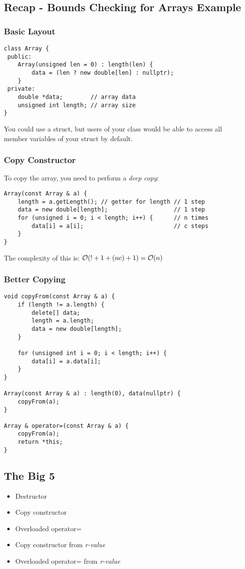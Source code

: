 \subsection{Recap - Bounds Checking for Arrays Example}
\subsubsection{Basic Layout}
\begin{lstlisting}[style=C++]
class Array {
 public:
    Array(unsigned len = 0) : length(len) {
        data = (len ? new double[len] : nullptr);
    }
 private:
    double *data;        // array data
    unsigned int length; // array size
}
\end{lstlisting}
You could use a struct, but users of your class would be able to access all member variables of your struct by default.

\subsubsection{Copy Constructor}
To copy the array, you need to perform a \textit{deep copy}:
\begin{lstlisting}[style=C++]
Array(const Array & a) {
    length = a.getLength(); // getter for length // 1 step
    data = new double[length];                   // 1 step
    for (unsigned i = 0; i < length; i++) {      // n times
        data[i] = a[i];                          // c steps
    }
}
\end{lstlisting}
The complexity of this is: $\mathcal{O}(! + 1 + (nc) + 1)=\mathcal{O}(n)$

\subsubsection{Better Copying}
\begin{lstlisting}[style=C++]
void copyFrom(const Array & a) {
    if (length != a.length) {
        delete[] data;
        length = a.length;
        data = new double[length];
    }

    for (unsigned int i = 0; i < length; i++) {
        data[i] = a.data[i];
    }
}

Array(const Array & a) : length(0), data(nullptr) {
    copyFrom(a);
}

Array & operator=(const Array & a) {
    copyFrom(a);
    return *this;
}
\end{lstlisting}

\subsection{The Big 5}
\begin{itemize}
	\item Destructor
	\item Copy constructor
	\item Overloaded operator=
	\item Copy constructor from \textit{r-value}
	\item Overloaded operator= from \textit{r-value}
\end{itemize}

